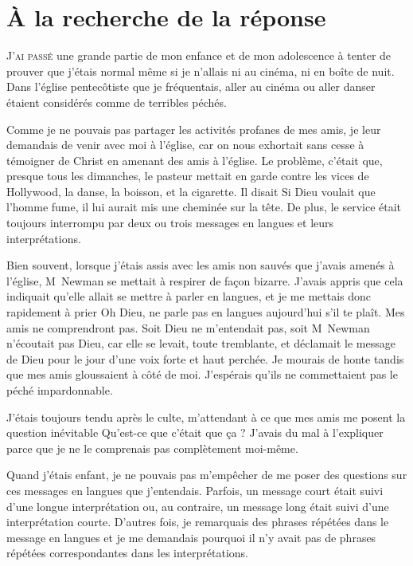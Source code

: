 \chapter{\`A la recherche de la r\'eponse}

\lettrine{J}{'ai passé}
 une grande partie de mon enfance et de mon
 adolescence à tenter de prouver que j'étais normal même si je n'allais ni au
 cinéma, ni en boîte de nuit. Dans l'église pentecôtiste que je fréquentais,
 aller au cinéma ou aller danser étaient considérés comme de terribles péchés.

Comme je ne pouvais pas partager les activités profanes
 de mes amis, je leur demandais de venir avec moi à l'église,
 car on nous exhortait sans cesse à témoigner de Christ en amenant
 des amis à l'église. Le problème, c'était que, presque tous les dimanches,
 le pasteur mettait en garde contre les
 vices de Hollywood, la danse, la boisson, et la cigarette.
 Il disait\frcolon{} \Og Si Dieu voulait que l'homme fume, il lui aurait mis une
 cheminée sur la tête.\Fg{}
 De plus, le service était toujours interrompu par deux ou trois
 \Og messages en langues \Fg{} et leurs interprétations.

Bien souvent, lorsque j'étais assis avec les amis non sauvés que j'avais
 amenés à l'église, M~Newman se mettait à respirer de façon bizarre.
 J'avais appris que cela indiquait qu'elle allait se mettre à parler en
 langues, et je me mettais donc rapidement à prier\frcolon{}
 \Og Oh Dieu, ne parle pas en langues aujourd'hui s'il te plaît.
 Mes amis ne comprendront pas. \Fg{}
 Soit Dieu ne m'entendait pas, soit M~Newman n'écoutait pas Dieu,
 car elle se levait, toute tremblante, et déclamait le message de Dieu pour le jour
 d'une voix forte et haut perchée. Je mourais de honte tandis que mes amis
 gloussaient à côté de moi. J'espérais qu'ils ne commettaient pas le péché
 impardonnable.

J'étais toujours tendu après le culte, m'attendant à ce que mes amis me
 posent la question inévitable\frcolon{}
 \Og Qu'est-ce que c'était que ça ? \Fg{}
 J'avais du mal à l'expliquer parce que je ne le comprenais pas complètement
 moi-même.
\noclub[3]

Quand j'étais enfant, je ne pouvais pas m'empêcher de me poser des questions sur
 ces \Og messages en langues \Fg{} que j'entendais. Parfois, un message court
 était suivi d'une longue interprétation ou, au contraire, un message long était
 suivi d'une interprétation courte. D'autres fois, je remarquais des phrases
 répétées dans le message en langues et je me demandais pourquoi il n'y avait
 pas de phrases répétées correspondantes dans les interprétations.

